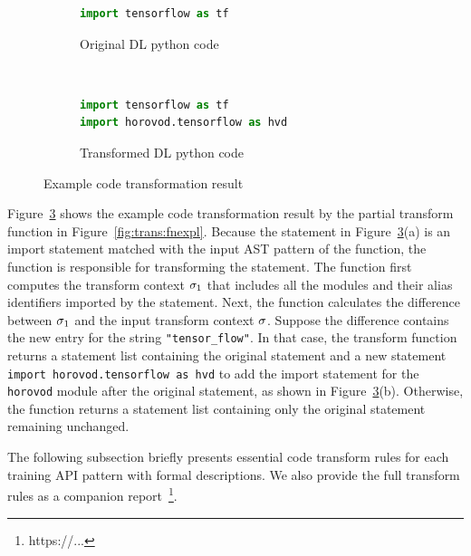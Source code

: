 \begin{figure}[ht!]
    \centering
    \begin{subfigure}[b]{0.48\textwidth}
        \begin{lstlisting}[language=Python]
import tensorflow as tf\end{lstlisting}
        \caption{Original DL python code}
        \label{fig:trans:ex01:org}
    \end{subfigure}
    ~
    \begin{subfigure}[b]{0.48\textwidth}
        \begin{lstlisting}[language=Python]
import tensorflow as tf
import horovod.tensorflow as hvd\end{lstlisting}
        \caption{Transformed DL python code}
        \label{fig:trans:ex01:hvd}
    \end{subfigure}
    \caption{Example code transformation result}
    \label{fig:trans:ex01}
\end{figure}

Figure~\ref{fig:trans:ex01} shows the example code transformation result by the
partial transform function in Figure~\ref{fig:trans:fnexpl}.
Because the statement in Figure~\ref{fig:trans:ex01}(a) is an import statement
matched with the input AST pattern of the function, the function is responsible
for transforming the statement.
The function first computes the transform context $\sigma_{1}$ that
includes all the modules and their alias identifiers imported by the statement.
Next, the function calculates the difference between $\sigma_{1}$ and the
input transform context $\sigma$.
Suppose the difference contains the new entry for the string {\tt "tensor\_flow"}.
In that case, the transform function returns a statement list containing the
original statement and a new statement {\tt import horovod.tensorflow as hvd}
to add the import statement for the {\tt horovod} module after the original
statement, as shown in Figure~\ref{fig:trans:ex01}(b).  
Otherwise, the function returns a statement list containing only the original
statement remaining unchanged.

The following subsection briefly presents essential code transform rules for
each training API pattern with formal descriptions. 
We also provide the full transform rules as a companion
report~\footnote{https://...}.

